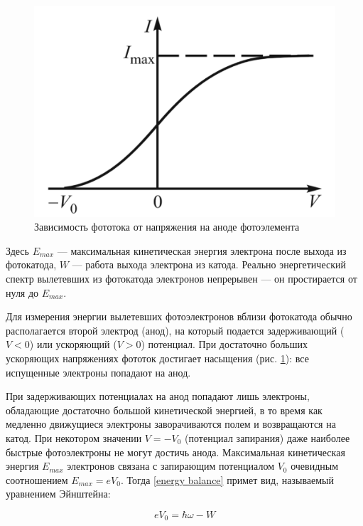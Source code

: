 \documentclass[a4paper, 12pt]{article}
\begin{document}
	\begin{figure}
		\includegraphics[width=\linewidth]{I_V.png}
		\caption{Зависимость фототока от напряжения на аноде фотоэлемента}
		\label{ris I(V)}
	\end{figure}
	
	Здесь $ E_{max} $ ---  максимальная кинетическая энергия электрона после выхода из фотокатода, $ W $ --- работа выхода электрона из катода. Реально энергетический спектр вылетевших из фотокатода электронов непрерывен --- он простирается от нуля до $ E_{max} $. 
	
	Для измерения энергии вылетевших фотоэлектронов вблизи фотокатода
	обычно располагается второй электрод
	(анод), на который подается задерживающий ($ V < 0 $) или ускоряющий ($ V >
	0 $) потенциал. При достаточно больших
	ускоряющих напряжениях фототок достигает насыщения (рис. \ref{ris I(V)}): все испущенные электроны попадают на анод.
	
	При задерживающих потенциалах на анод попадают лишь электроны,
	обладающие достаточно большой кинетической энергией, в то время
	как медленно движущиеся электроны заворачиваются полем и возвращаются на катод. При некотором значении $ V = -V_0 $ (потенциал запирания) даже наиболее быстрые фотоэлектроны не могут достичь
	анода.
	Максимальная кинетическая энергия $ E_{max} $ электронов связана с
	запирающим потенциалом $ V_0 $ очевидным соотношением $ E_{max} = eV_0 $. Тогда \eqref{energy balance} примет вид, называемый уравнением Эйнштейна:
	
	\begin{equation}\label{Einsteain}
	eV_0 = \hbar\omega - W 
	\end{equation}
	
\end{document}
